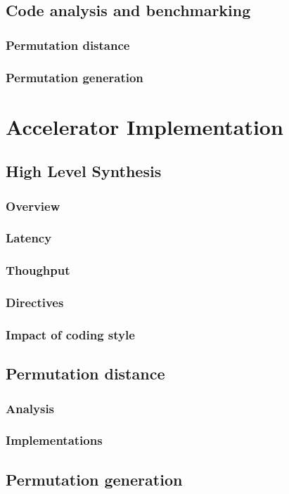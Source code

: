 \documentclass{iccmemoria}
\begin{document}
  \section{Code analysis and benchmarking} 
    \subsection{Permutation distance}
    \subsection{Permutation generation}

\chapter{Accelerator Implementation}
  \section{High Level Synthesis}
    \subsection{Overview}
    \subsection{Latency}
    \subsection{Thoughput}
    \subsection{Directives}
    \subsection{Impact of coding style}
  \section{Permutation distance}
    \subsection{Analysis}
    \subsection{Implementations}
  \section{Permutation generation}
\end{document}
